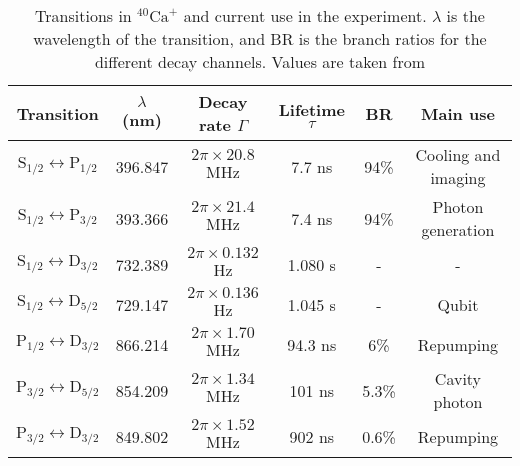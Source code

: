 \begin{table}[H]
\centering
\begin{tabular}{c c c c c c}
 \toprule
    {Transition} & { $\lambda$ (nm)} & {Decay rate $\Gamma$} & Lifetime $\tau$ & BR & {Main use} \\ \midrule
   $\text{S}_{1/2} \leftrightarrow \text{P}_{1/2}$ & 396.847 & $2\pi \times 20.8$ MHz & 7.7 ns & 94\% &Cooling and imaging \\
    $\text{S}_{1/2} \leftrightarrow \text{P}_{3/2}$  & 393.366 & $2\pi \times 21.4$ MHz & 7.4 ns & 94\% &Photon generation\\ \midrule
   $\text{S}_{1/2} \leftrightarrow \text{D}_{3/2}$ & 732.389 & $2\pi \times 0.132$ Hz & 1.080 s & - & - \\
    $\text{S}_{1/2} \leftrightarrow \text{D}_{5/2}$  & 729.147 & $2\pi \times 0.136$ Hz & 1.045 s & - & Qubit  \\\midrule
    $\text{P}_{1/2} \leftrightarrow \text{D}_{3/2}$  & 866.214 &  $2\pi \times 1.70$ MHz  &  94.3 ns & 6\% & Repumping \\
    $\text{P}_{3/2} \leftrightarrow \text{D}_{5/2}$  & 854.209 & $2\pi \times 1.34$ MHz & 101 ns & 5.3\%  & Cavity photon  \\
    $\text{P}_{3/2} \leftrightarrow \text{D}_{3/2}$  & 849.802 & $2\pi \times 1.52$ MHz  & 902 ns & 0.6\%  & Repumping \\ \bottomrule
\end{tabular}
\caption{Transitions in $^{40}\text{Ca}^+$ and current use in the experiment. $\lambda$ is the wavelength of the transition, and BR is the branch ratios for the different decay channels. Values are taken from \cite{ion_spacing,stute}}
\label{transitiontable}
\end{table}

